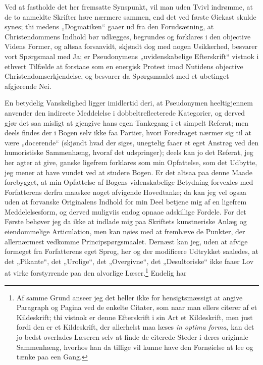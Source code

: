 Ved at fastholde det her fremsatte Synspunkt, vil man uden Tvivl
indrømme, at de to anmeldte Skrifter høre nærmere sammen, end det
ved første Øiekast skulde synes; thi medens „Dogmatiken“ gaaer ud
fra den Forudsætning, at Christendommens Indhold bør udlægges,
begrundes og forklares i den objective Videns Former, og altsaa
forsaavidt, skjøndt dog med nogen Usikkerhed, besvarer vort
Spørgsmaal med Ja; er Pseudonymens „uvidenskabelige Efterskrift“
vistnok i ethvert Tilfælde at forstaae som en energisk Protest
imod Nutidens objective Christendomserkjendelse, og besvarer da
Spørgsmaalet med et ubetinget afgjørende Nei.

En betydelig Vanskelighed ligger imidlertid deri, at Pseudonymen
heeltigjennem anvender den indirecte Meddelelse i
dobbeltreflecterede Kategorier, og derved gjør
 det saa misligt at gjengive hans egen Tankegang i et simpelt
Referat; men deels findes der i Bogen selv ikke faa Partier, hvori
Foredraget nærmer sig til at være „docerende“ (skjøndt hvad der
siges, unegtelig faaer et eget Anstrøg ved den humoristiske
Sammenhæng, hvoraf det udspringer); deels kan jo det Referat, jeg
her agter at give, ganske ligefrem forklares som min Opfattelse,
som det Udbytte, jeg mener at have vundet ved at studere Bogen. Er
det altsaa paa denne Maade forebygget, at min Opfattelse af Bogens
videnskabelige Betydning forvexles%
{} med Forfatterens derfra maaskee noget afvigende Hovedtanke; da
kan jeg vel ogsaa uden at forvanske Originalens Indhold for min
Deel betjene mig af en ligefrem Meddelelsesform, og derved
muligviis endog opnaae adskillige Fordele. For det Første behøver
jeg da ikke at indlade mig paa Skriftets kunstneriske Anlæg og
eiendommelige Articulation, men kan nøies med at fremhæve de
Punkter, der allernærmest vedkomme Principspørgsmaalet. Dernæst
kan jeg, uden at afvige formeget fra Forfatterens eget Sprog, her
og der modificere Udtrykket saaledes, at det „Pikante“, det
„Urolige“, det „Overgivne“, det „Desultoriske“ ikke faaer Lov at
virke forstyrrende paa den alvorlige Læser.\footnote{Af samme
Grund anseer jeg det heller ikke for hensigtsmæssigt at angive
Paragraph og Pagina ved de enkelte Citater, som naar man ellers
citerer af et Kildeskrift; thi vistnok er denne Efterskrift i sin
Art et Kildeskrift, men just fordi den er et Kildeskrift, der
allerhelst maa læses \textit{in optima forma}, kan det jo
bedst overlades Læseren selv at finde de citerede Steder i deres
originale Sammenhæng, hvorhos han da tillige vil kunne have den
Fornøielse at lee og tænke paa een Gang.} Endelig har
